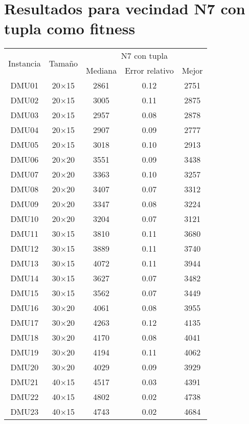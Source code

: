 \section{Resultados para vecindad N7 con tupla como fitness}

\begin{table}[H]
\centering
\begin{tabular}{@{}ccccc@{}}
\toprule
\multirow{2}{*}{Instancia} & \multirow{2}{*}{Tamaño} & \multicolumn{3}{c}{N7 con tupla} \\ \cmidrule(lr){3-5}
& & Mediana& Error relativo & Mejor  \\ \midrule
DMU01 & 20$\times$15 & 2861 & 0.12 & 2751\\ 
DMU02 & 20$\times$15 & 3005 & 0.11 & 2875\\ 
DMU03 & 20$\times$15 & 2957 & 0.08 & 2878\\ 
DMU04 & 20$\times$15 & 2907 & 0.09 & 2777\\ 
DMU05 & 20$\times$15 & 3018 & 0.10 & 2913\\ 
DMU06 & 20$\times$20 & 3551 & 0.09 & 3438\\ 
DMU07 & 20$\times$20 & 3363 & 0.10 & 3257\\ 
DMU08 & 20$\times$20 & 3407 & 0.07 & 3312\\ 
DMU09 & 20$\times$20 & 3347 & 0.08 & 3224\\ 
DMU10 & 20$\times$20 & 3204 & 0.07 & 3121\\ 
DMU11 & 30$\times$15 & 3810 & 0.11 & 3680\\ 
DMU12 & 30$\times$15 & 3889 & 0.11 & 3740\\ 
DMU13 & 30$\times$15 & 4072 & 0.11 & 3944\\ 
DMU14 & 30$\times$15 & 3627 & 0.07 & 3482\\ 
DMU15 & 30$\times$15 & 3562 & 0.07 & 3449\\ 
DMU16 & 30$\times$20 & 4061 & 0.08 & 3955\\ 
DMU17 & 30$\times$20 & 4263 & 0.12 & 4135\\ 
DMU18 & 30$\times$20 & 4170 & 0.08 & 4041\\ 
DMU19 & 30$\times$20 & 4194 & 0.11 & 4062\\ 
DMU20 & 30$\times$20 & 4029 & 0.09 & 3929\\ 
DMU21 & 40$\times$15 & 4517 & 0.03 & 4391\\ 
DMU22 & 40$\times$15 & 4802 & 0.02 & 4738\\ 
DMU23 & 40$\times$15 & 4743 & 0.02 & 4684\\ 

\end{tabular}
\end{table}
